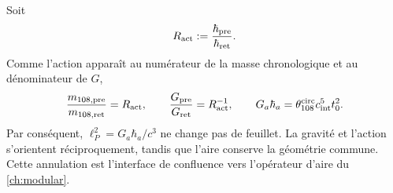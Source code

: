 Soit
\begin{equation}
\label{eq:gravity-Ract}
R_{\rm act}:=\frac{\hbar_{\rm pre}}{\hbar_{\rm ret}}.
\end{equation}
Comme l'action apparaît au numérateur de la masse chronologique et au
dénominateur de \(G\),
\begin{equation}
\label{eq:gravity-twoway-covariance}
\frac{m_{108,\rm pre}}{m_{108,\rm ret}}=R_{\rm act},
\qquad
\frac{G_{\rm pre}}{G_{\rm ret}}=R_{\rm act}^{-1},
\qquad
G_a\hbar_a
=\theta_{108}^{\rm circ}c_{\rm int}^5t_0^2.
\end{equation}
Par conséquent, \(\ell_P^2=G_a\hbar_a/c^3\) ne change pas de feuillet. La gravité et
l'action s'orientent réciproquement, tandis que l'aire conserve la
géométrie commune. Cette annulation est l'interface de confluence vers l'opérateur
d'aire du \cref{ch:modular}.
